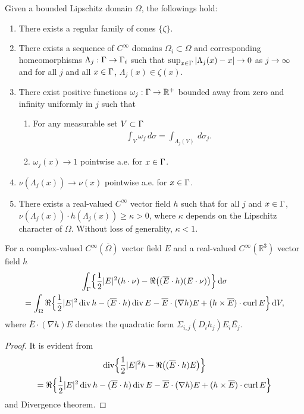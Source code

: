 \begin{prp}
  \label{pr:lip}
  Given a bounded Lipschitz domain $\Omega$, the followings hold:
  \begin{enumerate}
    \item\label{it:lip1}
      There exists a regular family of cones $\{\zeta\}$.
    \item There exists a sequence of $C^{\infty}$ domains 
      $\Omega_i\subset \Omega$ and corresponding homeomorphisms 
      $\Lambda_j:\Gamma\to\Gamma_i$ such that 
      $\sup_{x\in\Gamma}|\Lambda_j(x)-x|\to 0$ as $j\to\infty$ and
      for all $j$ and all $x\in\Gamma$, $\Lambda_j(x)\in\zeta(x)$.
    \item There exist positive functions 
      $\omega_j:\Gamma\to\mathbb{R}^+$ bounded away from zero and infinity 
      uniformly in $j$ such that 
      \begin{enumerate}
	\item For any measurable set $V\subset\Gamma$
	  \begin{align*}
	    \int_V \omega_j\,d\sigma=\int_{\Lambda_j(V)}\,d\sigma_j.
	  \end{align*}
	\item $\omega_j(x)\to 1$ pointwise a.e. for $x\in\Gamma$. 
      \end{enumerate}
    \item $\nu(\Lambda_j(x))\to\nu(x)$ pointwise a.e. for $x\in\Gamma$. 
    \item\label{it:kk}
      There exists a real-valued $C^{\infty}$ vector field $h$ such that for
      all $j$ and $x\in\Gamma$, 
      $\nu(\Lambda_j(x))\cdot h(\Lambda_j(x))\geqslant \kappa>0$, where 
      $\kappa$ depends on the Lipschitz character of $\Omega$. 
      Without loss of generality, $\kappa<1$.
  \end{enumerate}
\end{prp}

\begin{lmm}
  For a complex-valued $C^{\infty}(\overline{\Omega})$ vector field $E$ and
  a real-valued $C^{\infty}(\mathbb{R}^3)$ vector field $h$
  \begin{multline}
    \int_{\Gamma}\Bigl\{\frac{1}{2}|E|^2 (h\cdot\nu)-\operatorname{\Re}\bigl((\overline{E}\cdot h)
    (E\cdot\nu)\bigr)\Bigr\}\,\text{d}\sigma\\
    =\int_{\Omega}\operatorname{\Re}\Bigl\{\frac{1}{2}|E|^2\operatorname{div} h-(\overline{E}\cdot h)\operatorname{div} E
    -\overline{E}\cdot(\nabla h)E+(h\times\overline{E})\cdot\operatorname{curl} E\Bigr\}\,\text{d}V,
    \label{eq:Rellich}
  \end{multline}
  where $\overline{E}\cdot(\nabla h)E$ denotes the quadratic form
  $\Sigma_{i,j}(D_i h_j) E_i \overline{E_j}$.
\end{lmm}
\begin{proof}
  It is evident from
  \begin{multline*}
    \operatorname{div}\Bigl\{\frac{1}{2}|E|^2 h-\operatorname{\Re}\bigl((\overline{E}\cdot h)E\bigr)
    \Bigr\}\\
    =\operatorname{\Re}\Bigl\{\frac{1}{2}|E|^2\operatorname{div} h-(\overline{E}\cdot h)\operatorname{div} E-
    \overline{E}\cdot(\nabla h)E+(h\times\overline{E})\cdot\operatorname{curl} E\Bigr\}
  \end{multline*}
  and Divergence theorem. 
\end{proof}

